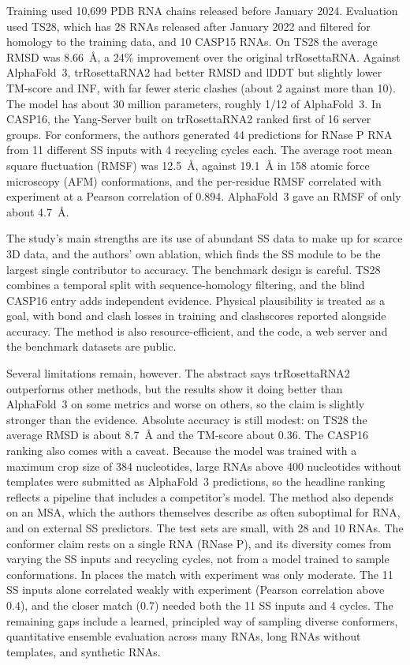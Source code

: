 \documentclass{FastFyp}
\begin{document}
Training used 10,699 PDB RNA chains released before January 2024. Evaluation used TS28, which has 28 RNAs released after January 2022 and filtered for homology to the training data, and 10 CASP15 RNAs. On TS28 the average RMSD was 8.66~\AA{}, a 24\% improvement over the original trRosettaRNA. Against AlphaFold~3, trRosettaRNA2 had better RMSD and lDDT but slightly lower TM-score and INF, with far fewer steric clashes (about 2 against more than 10). The model has about 30 million parameters, roughly 1/12 of AlphaFold~3. In CASP16, the Yang-Server built on trRosettaRNA2 ranked first of 16 server groups. For conformers, the authors generated 44 predictions for RNase P RNA from 11 different SS inputs with 4 recycling cycles each. The average root mean square fluctuation (RMSF) was 12.5~\AA{}, against 19.1~\AA{} in 158 atomic force microscopy (AFM) conformations, and the per-residue RMSF correlated with experiment at a Pearson correlation of 0.894. AlphaFold~3 gave an RMSF of only about 4.7~\AA{}.

The study's main strengths are its use of abundant SS data to make up for scarce 3D data, and the authors' own ablation, which finds the SS module to be the largest single contributor to accuracy. The benchmark design is careful. TS28 combines a temporal split with sequence-homology filtering, and the blind CASP16 entry adds independent evidence. Physical plausibility is treated as a goal, with bond and clash losses in training and clashscores reported alongside accuracy. The method is also resource-efficient, and the code, a web server and the benchmark datasets are public.

Several limitations remain, however. The abstract says trRosettaRNA2 outperforms other methods, but the results show it doing better than AlphaFold~3 on some metrics and worse on others, so the claim is slightly stronger than the evidence. Absolute accuracy is still modest: on TS28 the average RMSD is about 8.7~\AA{} and the TM-score about 0.36. The CASP16 ranking also comes with a caveat. Because the model was trained with a maximum crop size of 384 nucleotides, large RNAs above 400 nucleotides without templates were submitted as AlphaFold~3 predictions, so the headline ranking reflects a pipeline that includes a competitor's model. The method also depends on an MSA, which the authors themselves describe as often suboptimal for RNA, and on external SS predictors. The test sets are small, with 28 and 10 RNAs. The conformer claim rests on a single RNA (RNase P), and its diversity comes from varying the SS inputs and recycling cycles, not from a model trained to sample conformations. In places the match with experiment was only moderate. The 11 SS inputs alone correlated weakly with experiment (Pearson correlation above 0.4), and the closer match (0.7) needed both the 11 SS inputs and 4 cycles. The remaining gaps include a learned, principled way of sampling diverse conformers, quantitative ensemble evaluation across many RNAs, long RNAs without templates, and synthetic RNAs.
\end{document}

